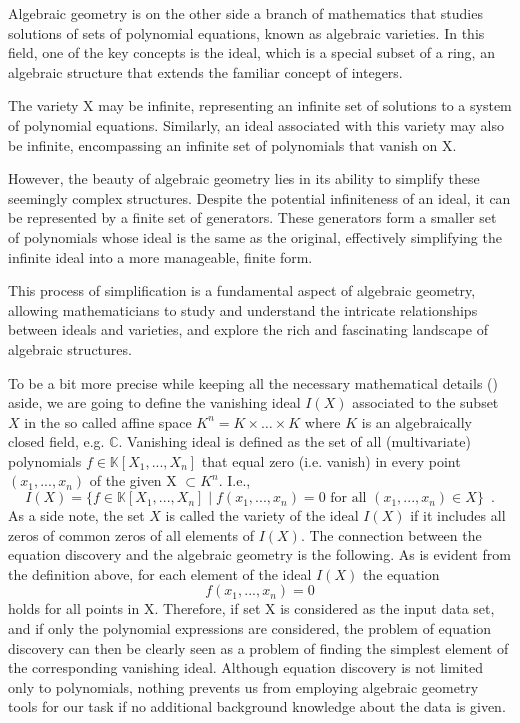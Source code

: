 \documentclass[runningheads]{llncs}
\begin{document}
Algebraic geometry is on the other side
a branch of mathematics that studies solutions of sets of polynomial equations, known as algebraic varieties. In this field, one of the key concepts is the ideal, which is a special subset of a ring, an algebraic structure that extends the familiar concept of integers.

The variety X may be infinite, representing an infinite set of solutions to a system of polynomial equations. Similarly, an ideal associated with this variety may also be infinite, encompassing an infinite set of polynomials that vanish on X.

However, the beauty of algebraic geometry lies in its ability to simplify these seemingly complex structures. Despite the potential infiniteness of an ideal, it can be represented by a finite set of generators. These generators form a smaller set of polynomials whose ideal is the same as the original, effectively simplifying the infinite ideal into a more manageable, finite form.

This process of simplification is a fundamental aspect of algebraic geometry, allowing mathematicians to study and understand the intricate relationships between ideals and varieties, and explore the rich and fascinating landscape of algebraic structures.

To be a bit more precise while keeping all the necessary mathematical details (\cite{Shafarevich}) aside, we are going to define the vanishing ideal $I(X)$ associated to the subset $X$
 in the so called affine space $K^n = K\times \dots \times K$ where $K$ is an 
algebraically closed field, e.g. $\mathbb{C}$. 
Vanishing ideal is defined as the set 
of all 
(multivariate) polynomials $ f \in \mathbb{K}[X_1, ..., X_n]$ 
that equal zero (i.e. vanish) in every point $(x_1, ..., x_n)$ of the 
given X $\subset K^n$.
I.e., 
$$ I(X) = \{ f \in \mathbb{K}[X_1, ..., X_n] \mid f(x_1, ..., x_n) = 0 \text{ for all } (x_1, ..., x_n) \in X \}\enspace. $$
As a side note, the set $X$ is called the variety of the ideal $I(X)$ if it includes all zeros of common zeros of all elements of $I(X)$.
The connection between the equation discovery and the algebraic geometry is the following. 
As is evident from the definition above, for each element of the ideal $I(X)$ the equation
$$ f(x_1, ..., x_n) = 0 $$
holds for all points in X.
Therefore, if set X is considered as the input data set, and if only the 
polynomial expressions are considered,
the problem of equation discovery can then be
clearly seen as a problem of finding the simplest element of the 
corresponding vanishing ideal.
Although equation discovery is not limited only to polynomials, 
nothing prevents us from employing algebraic geometry tools for our task
if no additional background knowledge about the data is given.
\end{document}
